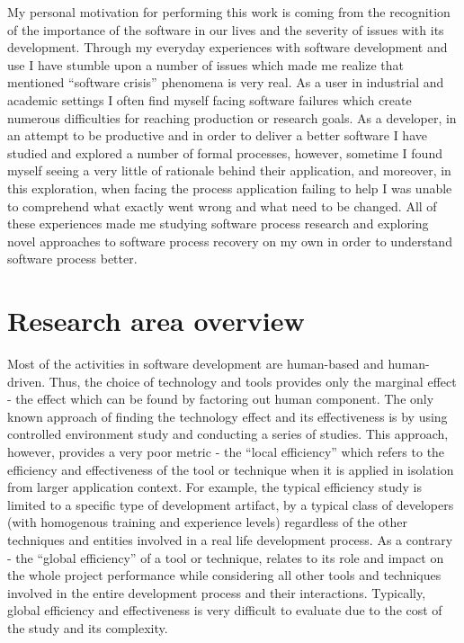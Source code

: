 My personal motivation for performing this work is coming from the recognition of the 
importance of the software in our lives and the severity of issues with its development. 
Through my everyday experiences with software development and use I have stumble upon 
a number of issues which made me realize that mentioned ``software crisis'' phenomena is very real.
As a user in industrial and academic settings I often find myself facing software failures 
which create numerous difficulties for reaching production or research goals. As a developer, 
in an attempt to be productive and in order to deliver a better software I have studied and 
explored a number of formal processes, however, sometime I found myself seeing a very little of 
rationale behind their application, and moreover, in this exploration, when facing the process
application failing to help I was unable to comprehend what exactly went wrong and what need 
to be changed. All of these experiences made me studying software process research and exploring
novel approaches to software process recovery on my own in order to understand software process better.

\section{Research area overview}
Most of the activities in software development are human-based and human-driven. Thus, the choice 
of technology and tools provides only the marginal effect - the effect which can be found by 
factoring out human component. The only known approach of finding the technology effect and 
its effectiveness is by using controlled environment study and conducting a series of studies. 
This approach, however, provides a very poor metric - the ``local efficiency'' which refers to 
the efficiency and effectiveness of the tool or technique when it is applied in isolation 
from larger application context. 
For example, the typical efficiency study is limited to a specific type of development 
artifact, by a typical class of developers (with homogenous training and experience levels) 
regardless of the other techniques and entities involved in a real life development process. 
As a contrary  - the ``global efficiency'' of a tool or technique, relates to its role and 
impact on the whole project performance while considering all other tools and techniques 
involved in the entire development process and their interactions. Typically, global efficiency 
and effectiveness is very difficult to evaluate due to the cost of the study and its complexity.

